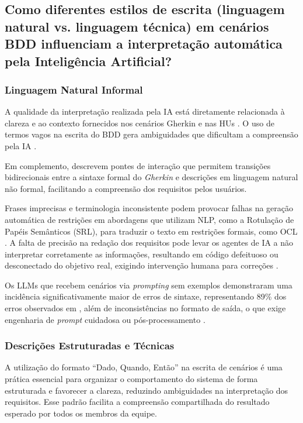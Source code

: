 \subsection{Como diferentes estilos de escrita (linguagem natural vs. linguagem técnica) em cenários BDD influenciam a interpretação automática pela Inteligência Artificial?}

\subsubsection{Linguagem Natural Informal}

A qualidade da interpretação realizada pela IA está diretamente relacionada à clareza e ao contexto fornecidos nos cenários Gherkin e nas HUs \cite{Ferreira2025}. O uso de termos vagos na escrita do BDD gera ambiguidades que dificultam a compreensão pela IA \cite{Alinezhadtilaki2025}.

Em complemento,  descrevem pontes de interação que permitem transições bidirecionais entre a sintaxe formal do \textit{Gherkin} e descrições em linguagem natural não formal, facilitando a compreensão dos requisitos pelos usuários.

Frases imprecisas e terminologia inconsistente podem provocar falhas na geração automática de restrições em abordagens que utilizam NLP, como a Rotulação de Papéis Semânticos (SRL), para traduzir o texto em restrições formais, como OCL \cite{Wang2022}. A falta de precisão na redação dos requisitos pode levar os agentes de IA a não interpretar corretamente as informações, resultando em código defeituoso ou desconectado do objetivo real, exigindo intervenção humana para correções \cite{Zhang2025}.

Os LLMs que recebem cenários via \textit{prompting} sem exemplos demonstraram uma incidência significativamente maior de erros de sintaxe, representando 89\% dos erros observados em \cite{Karpurapu2024}, além de inconsistências no formato de saída, o que exige engenharia de \textit{prompt} cuidadosa ou pós-processamento \cite{Pysmennyi2025}.

\subsubsection{Descrições Estruturadas e Técnicas}

A utilização do formato “Dado, Quando, Então” na escrita de cenários é uma prática essencial para organizar o comportamento do sistema de forma estruturada e favorecer a clareza, reduzindo ambiguidades na interpretação dos requisitos. Esse padrão facilita a compreensão compartilhada do resultado esperado por todos os membros da equipe\cite{Alinezhadtilaki2025}.

